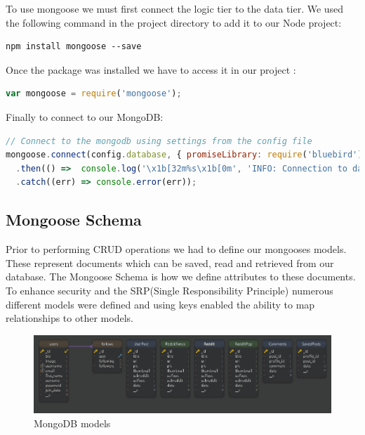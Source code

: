 To use mongoose we must first connect the logic tier to the data tier. We used the following command in the project directory to add it to our Node project:
\begin{verbatim}
npm install mongoose --save
\end{verbatim}

Once the package was installed we have to access it in our project :
\begin{lstlisting}[language=JavaScript]
var mongoose = require('mongoose');
\end{lstlisting}

Finally to connect to our MongoDB:
\begin{lstlisting}[language=JavaScript]
// Connect to the mongodb using settings from the config file
mongoose.connect(config.database, { promiseLibrary: require('bluebird') })
  .then(() =>  console.log('\x1b[32m%s\x1b[0m', 'INFO: Connection to database succesfull'))
  .catch((err) => console.error(err));
\end{lstlisting}

\subsection{Mongoose Schema}
Prior to performing CRUD operations we had to define our  mongooses models. These represent documents which can be saved, read and retrieved from our database. The Mongoose Schema is how we define attributes to these documents. To enhance security and the SRP(Single Responsibility Principle) numerous different models were defined and using keys enabled the ability to map relationships to other models.

\begin{figure}[H]
  \includegraphics[width=\linewidth]{img/schemas.PNG}
  \caption{MongoDB models}
  \label{fig:schema}
\end{figure}

